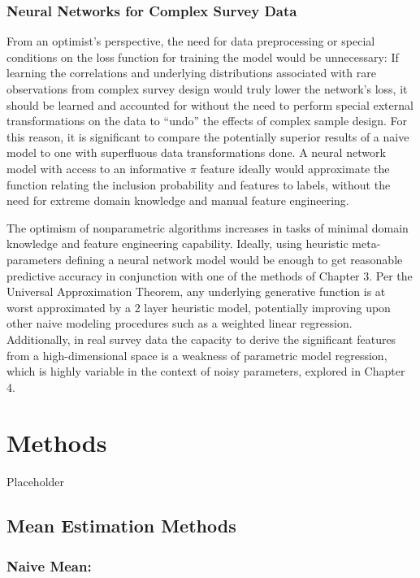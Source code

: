 \documentclass[12pt,twoside]{reedthesis}
\begin{document}
\subsection{Neural Networks for Complex Survey
Data}\label{neural-networks-for-complex-survey-data}

From an optimist's perspective, the need for data preprocessing or
special conditions on the loss function for training the model would be
unnecessary: If learning the correlations and underlying distributions
associated with rare observations from complex survey design would truly
lower the network's loss, it should be learned and accounted for without
the need to perform special external transformations on the data to
``undo'' the effects of complex sample design. For this reason, it is
significant to compare the potentially superior results of a naive model
to one with superfluous data transformations done. A neural network
model with access to an informative \(\pi\) feature ideally would
approximate the function relating the inclusion probability and features
to labels, without the need for extreme domain knowledge and manual
feature engineering.

The optimism of nonparametric algorithms increases in tasks of minimal
domain knowledge and feature engineering capability. Ideally, using
heuristic meta-parameters defining a neural network model would be
enough to get reasonable predictive accuracy in conjunction with one of
the methods of Chapter 3. Per the Universal Approximation Theorem, any
underlying generative function is at worst approximated by a 2 layer
heuristic model, potentially improving upon other naive modeling
procedures such as a weighted linear regression. Additionally, in real
survey data the capacity to derive the significant features from a
high-dimensional space is a weakness of parametric model regression,
which is highly variable in the context of noisy parameters, explored in
Chapter 4.

\chapter{Methods}\label{methods}

Placeholder

\section{Mean Estimation Methods}\label{mean-estimation-methods}

\subsection{Naive Mean:}\label{naive-mean}
\end{document}
